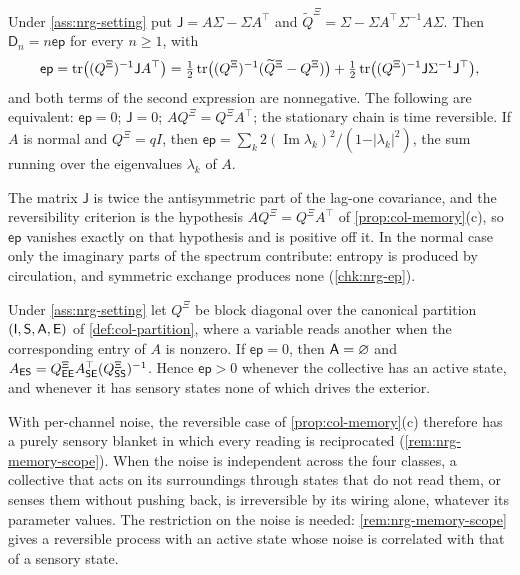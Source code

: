 \begin{theorem}\label{thm:nrg-ep}
Under \cref{ass:nrg-setting} put $\mathsf J=A\Sigma-\Sigma A^\top$ and $\widetilde Q^{\Xi}=\Sigma-\Sigma A^\top\Sigma^{-1}A\Sigma$. Then $\mathsf D_n=n\mathsf{ep}$ for every $n\ge1$, with
\begin{equation}\label{eq:nrg-ep}
\mathsf{ep}=\operatorname{tr}\bigl((Q^{\Xi})^{-1}\mathsf JA^\top\bigr)=\tfrac12\operatorname{tr}\bigl((Q^{\Xi})^{-1}(\widetilde Q^{\Xi}-Q^{\Xi})\bigr)+\tfrac12\operatorname{tr}\bigl((Q^{\Xi})^{-1}\mathsf J\Sigma^{-1}\mathsf J^\top\bigr),
\end{equation}
and both terms of the second expression are nonnegative. The following are equivalent: $\mathsf{ep}=0$; $\mathsf J=0$; $AQ^{\Xi}=Q^{\Xi}A^\top$; the stationary chain is time reversible. If $A$ is normal and $Q^{\Xi}=qI$, then $\mathsf{ep}=\sum_k2(\operatorname{Im}\lambda_k)^2/(1-\vert\lambda_k\vert^2)$, the sum running over the eigenvalues $\lambda_k$ of $A$.
\end{theorem}

The matrix $\mathsf J$ is twice the antisymmetric part of the lag-one covariance, and the reversibility criterion is the hypothesis $AQ^{\Xi}=Q^{\Xi}A^\top$ of \cref{prop:col-memory}(c), so $\mathsf{ep}$ vanishes exactly on that hypothesis and is positive off it. In the normal case only the imaginary parts of the spectrum contribute: entropy is produced by circulation, and symmetric exchange produces none (\cref{chk:nrg-ep}).

\begin{corollary}\label{cor:nrg-blanket}
Under \cref{ass:nrg-setting} let $Q^{\Xi}$ be block diagonal over the canonical partition $(\mathsf{I},\mathsf{S},\mathsf{A},\mathsf{E})$ of \cref{def:col-partition}, where a variable reads another when the corresponding entry of $A$ is nonzero. If $\mathsf{ep}=0$, then $\mathsf{A}=\varnothing$ and $A_{\mathsf{E}\mathsf{S}}=Q^{\Xi}_{\mathsf{E}\mathsf{E}}A_{\mathsf{S}\mathsf{E}}^\top(Q^{\Xi}_{\mathsf{S}\mathsf{S}})^{-1}$. Hence $\mathsf{ep}>0$ whenever the collective has an active state, and whenever it has sensory states none of which drives the exterior.
\end{corollary}

With per-channel noise, the reversible case of \cref{prop:col-memory}(c) therefore has a purely sensory blanket in which every reading is reciprocated (\cref{rem:nrg-memory-scope}). When the noise is independent across the four classes, a collective that acts on its surroundings through states that do not read them, or senses them without pushing back, is irreversible by its wiring alone, whatever its parameter values. The restriction on the noise is needed: \cref{rem:nrg-memory-scope} gives a reversible process with an active state whose noise is correlated with that of a sensory state.

